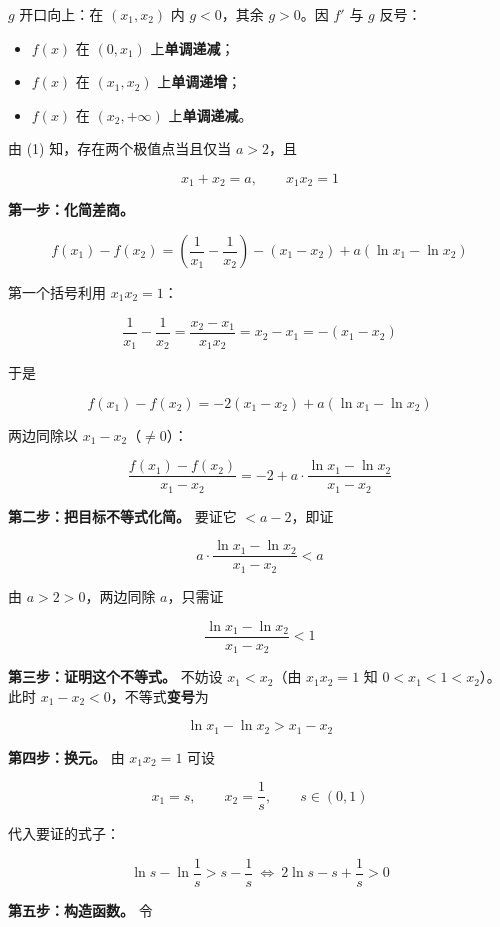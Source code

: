 $g$ 开口向上：在 $\left(x_1,x_2\right)$ 内 $g<0$，其余 $g>0$。因 $f'$ 与 $g$ 反号：

\begin{itemize}
\item $f(x)$ 在 $\left(0,x_1\right)$ 上\textbf{单调递减}；
\item $f(x)$ 在 $\left(x_1,x_2\right)$ 上\textbf{单调递增}；
\item $f(x)$ 在 $\left(x_2,+\infty\right)$ 上\textbf{单调递减}。
\end{itemize}


由 (1) 知，存在两个极值点当且仅当 $a>2$，且

\[x_1+x_2=a,\qquad x_1x_2=1\]

\textbf{第一步：化简差商。}

\[f\left(x_1\right)-f\left(x_2\right)=\left(\frac1{x_1}-\frac1{x_2}\right)-\left(x_1-x_2\right)+a\left(\ln x_1-\ln x_2\right)\]

第一个括号利用 $x_1x_2=1$：

\[\frac1{x_1}-\frac1{x_2}=\frac{x_2-x_1}{x_1x_2}=x_2-x_1=-\left(x_1-x_2\right)\]

于是

\[f\left(x_1\right)-f\left(x_2\right)=-2\left(x_1-x_2\right)+a\left(\ln x_1-\ln x_2\right)\]

两边同除以 $x_1-x_2$（$\ne0$）：

\[\frac{f\left(x_1\right)-f\left(x_2\right)}{x_1-x_2}=-2+a\cdot\frac{\ln x_1-\ln x_2}{x_1-x_2}\]

\textbf{第二步：把目标不等式化简。} 要证它 $<a-2$，即证

\[a\cdot\frac{\ln x_1-\ln x_2}{x_1-x_2}<a\]

由 $a>2>0$，两边同除 $a$，只需证

\[\frac{\ln x_1-\ln x_2}{x_1-x_2}<1\]

\textbf{第三步：证明这个不等式。} 不妨设 $x_1<x_2$（由 $x_1x_2=1$ 知 $0<x_1<1<x_2$）。此时 $x_1-x_2<0$，不等式\textbf{变号}为

\[\ln x_1-\ln x_2>x_1-x_2\]

\textbf{第四步：换元。} 由 $x_1x_2=1$ 可设

\[x_1=s,\qquad x_2=\frac1s,\qquad s\in(0,1)\]

代入要证的式子：

\[\ln s-\ln\frac1s>s-\frac1s\ \Longleftrightarrow\ 2\ln s-s+\frac1s>0\]

\textbf{第五步：构造函数。} 令

